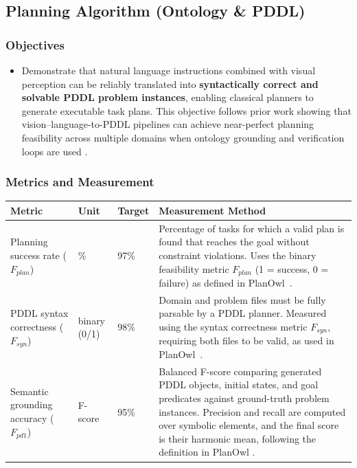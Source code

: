 \documentclass[12pt]{article}
\begin{document}

\subsection{Planning Algorithm (Ontology \& PDDL)}

\subsubsection{Objectives}
\begin{itemize}
\item Demonstrate that natural language instructions combined with visual perception can be reliably translated into \textbf{syntactically correct and solvable PDDL problem instances}, enabling classical planners to generate executable task plans. This objective follows prior work showing that vision--language-to-PDDL pipelines can achieve near-perfect planning feasibility across multiple domains when ontology grounding and verification loops are used \cite{planowl}.
\end{itemize}

\subsubsection{Metrics and Measurement}
\begin{center}
\begin{tabular}{|p{3.8cm}|p{2.2cm}|p{3.2cm}|p{5cm}|}
\hline
\textbf{Metric} & \textbf{Unit} & \textbf{Target} & \textbf{Measurement Method} \\
\hline

Planning success rate ($F_{plan}$) &
\% &
97\%&
Percentage of tasks for which a valid plan is found that reaches the goal without constraint violations. Uses the binary feasibility metric $F_{plan}$ (1 = success, 0 = failure) as defined in PlanOwl~\cite{planowl}. \\
\hline

PDDL syntax correctness ($F_{syn}$) &
binary (0/1) &
98\% &
Domain and problem files must be fully parsable by a PDDL planner. Measured using the syntax correctness metric $F_{syn}$, requiring both files to be valid, as used in PlanOwl~\cite{planowl}. \\
\hline

Semantic grounding accuracy ($F_{pd1}$) &
F-score &
95\% &
Balanced F-score comparing generated PDDL objects, initial states, and goal predicates against ground-truth problem instances. Precision and recall are computed over symbolic elements, and the final score is their harmonic mean, following the definition in PlanOwl \cite{planowl}. \\
\hline

\end{tabular}
\end{center}
\end{document}
